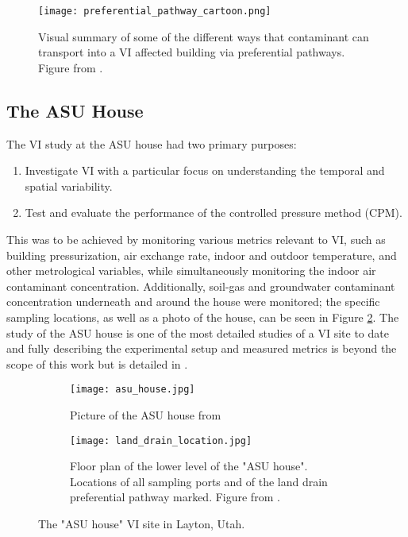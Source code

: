 \begin{figure}[htb!]
  \centering
  \texttt{[image: preferential\_pathway\_cartoon.png]}
  \caption{Visual summary of some of the different ways that contaminant can transport into a VI affected building via preferential pathways. Figure from \citeauthor{mchugh_evidence_2017}\cite{mchugh_evidence_2017}.}
  \label{fig:preferential_pathway_cartoon}
\end{figure}

\subsection{The ASU House}

The VI study at the ASU house had two primary purposes:
\begin{enumerate}
  \item Investigate VI with a particular focus on understanding the temporal and spatial variability.
  \item Test and evaluate the performance of the controlled pressure method (CPM).
\end{enumerate}\par

This was to be achieved by monitoring various metrics relevant to VI, such as building pressurization, air exchange rate, indoor and outdoor temperature, and other metrological variables, while simultaneously monitoring the indoor air contaminant concentration.
Additionally, soil-gas and groundwater contaminant concentration underneath and around the house were monitored; the specific sampling locations, as well as a photo of the house, can be seen in Figure \ref{fig:asu_house}.
The study of the ASU house is one of the most detailed studies of a VI site to date and fully describing the experimental setup and measured metrics is beyond the scope of this work but is detailed in \citeauthor{holton_temporal_2013}\cite{holton_temporal_2013}.\par

\begin{figure}[htb!]
  \centering
  \begin{subfigure}[t]{0.45\textwidth}
    \texttt{[image: asu\_house.jpg]}
    \caption{Picture of the ASU house from \citeauthor{holton_temporal_2013}\cite{holton_temporal_2013}}
    \label{fig:asu_house}
  \end{subfigure}
  \begin{subfigure}[t]{0.50\textwidth}
    \centering
    \texttt{[image: land\_drain\_location.jpg]}
    \caption{Floor plan of the lower level of the "ASU house". Locations of all sampling ports and of the land drain preferential pathway marked. Figure from \citeauthor{guo_identification_2015}\cite{guo_identification_2015}.}
    \label{fig:land_drain_location}
  \end{subfigure}
  \caption{The "ASU house" VI site in Layton, Utah.}
\end{figure}

